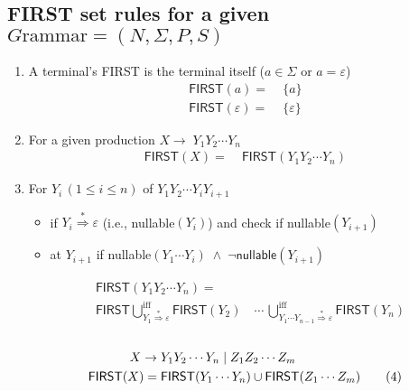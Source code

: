 \documentclass[10pt,a4paper,landscape]{article}
\begin{document}
%
\pagestyle{empty}
\begin{multicols*}{3}
\section*{\textsc{FIRST} set rules for a given $G\text{rammar} = (N,\Sigma,P,S)$}
\begin{enumerate}
\item A terminal's \textsf{FIRST} is the terminal itself ($a\in \Sigma$ or $a = \varepsilon$)
  \begin{align*}
    \mathsf{FIRST}(a)           =&\; \{a\}           \tag{1.1}\\
    \mathsf{FIRST}(\varepsilon) =&\; \{\varepsilon\} \tag{1.2}
  \end{align*}
\item For a given production $X \to\; Y_1Y_2\cdots Y_n$
  \begin{align*}
    \mathsf{FIRST}(X) =&\; \mathsf{FIRST}(Y_1Y_2\cdots Y_n) \tag{2}
  \end{align*}
\item For $Y_i\,(1 \leq i \leq n)$ of $Y_1Y_2\cdots Y_iY_{i+1}$
  \begin{itemize}
  \item {} if $Y_i\overset{\ast}{\Rightarrow}{\varepsilon}$ (i.e., \textsf{nullable}$(Y_i)$) and check if \textsf{nullable}$(Y_{i+1})$
  \item {} at $Y_{i+1}$ if \textsf{nullable}$(Y_1\cdots Y_i) \;\land\; \neg \mathsf{nullable}(Y_{i+1})$
  \end{itemize}
  \begin{align*}
    & \mathsf{FIRST}(Y_1Y_2\cdots Y_n) = \nonumber\\
    & \mathsf{FIRST}
\bigcup_{Y_1\overset{*}{\Rightarrow}\varepsilon}^{\text{iff}} \mathsf{FIRST}(Y_2) \quad\cdots\, \bigcup_{Y_1\cdots Y_{n-1}\overset{*}{\Rightarrow}\varepsilon}^{\text{iff}} \mathsf{FIRST}(Y_n) \tag{3}
  \end{align*}
\
  \begin{align*}
     X\to &\; Y_1Y_2\cdots Y_n \;|\; Z_1Z_2\cdots Z_m \nonumber \\
\mathsf{FIRST}(X) =&\; \mathsf{FIRST}(Y_1\cdots Y_n) \cup \mathsf{FIRST}(Z_1\cdots Z_m) \tag{4}
  \end{align*}
\end{enumerate}

\end{multicols*}
\end{document}

